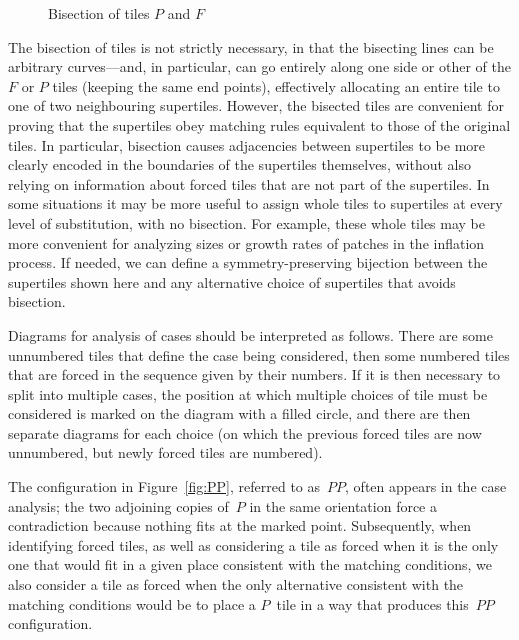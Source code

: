 \begin{figure}[htp!]
\begin{center}
\end{center}
\caption{Bisection of tiles $P$ and $F$}
\label{fig:substbisect}
\end{figure}

The bisection of tiles is not strictly necessary, in that the
bisecting lines can be arbitrary curves---and, in particular, can go
entirely along one side or other of the $F$ or $P$ tiles (keeping the
same end points), effectively allocating an entire tile to one of
two neighbouring supertiles.  However, the bisected tiles are convenient
for proving that the supertiles obey matching rules equivalent to those
of the original tiles.  In particular, bisection causes adjacencies
between supertiles to be more clearly encoded in 
the boundaries of the supertiles themselves, without also relying on
information about forced tiles that are not part of the supertiles.
In some situations it may be more useful to assign whole tiles to supertiles
at every level of substitution, with no bisection.  
For example, these whole tiles may be more convenient for analyzing sizes
or growth rates of patches in the inflation process.
If needed, we can
define a symmetry-preserving bijection between the supertiles
shown here and any alternative choice of supertiles that avoids bisection.

Diagrams for analysis of cases should be interpreted as follows.
There are some unnumbered tiles that define the case being considered,
then some numbered tiles that are forced in the sequence given by
their numbers.  If it is then necessary to split into multiple cases,
the position at which multiple choices of tile must be considered is
marked on the diagram with a filled circle, and there are then
separate diagrams for each choice (on which the previous forced tiles
are now unnumbered, but newly forced tiles are numbered).

The configuration in Figure~\ref{fig:PP}, referred to as~$PP$, often
appears in the case
analysis; the two adjoining copies of~$P$ in the same orientation
force a contradiction because nothing fits at the marked point.
Subsequently, when identifying forced tiles, as well as considering a
tile as forced when it is the only one that would fit in a given place
consistent with the matching conditions, we also consider a tile as
forced when the only alternative consistent with the matching
conditions would be to place a $P$~tile in a way that produces this~$PP$ 
configuration. 

